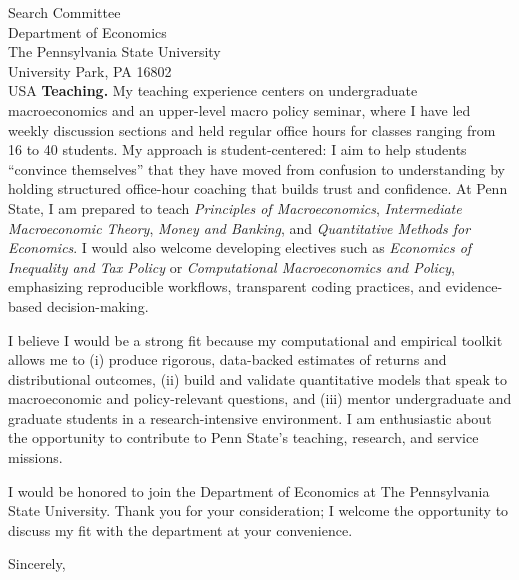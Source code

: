 \documentclass[11pt,letterpaper]{letter}
\begin{document}
\begin{letter}{Search Committee \\
Department of Economics \\
The Pennsylvania State University \\
University Park, PA 16802 \\ USA}
\textbf{Teaching.} My teaching experience centers on undergraduate macroeconomics and an upper-level macro policy seminar, where I have led weekly discussion sections and held regular office hours for classes ranging from 16 to 40 students. My approach is student-centered: I aim to help students “convince themselves” that they have moved from confusion to understanding by holding structured office-hour coaching that builds trust and confidence. At Penn State, I am prepared to teach \textit{Principles of Macroeconomics}, \textit{Intermediate Macroeconomic Theory}, \textit{Money and Banking}, and \textit{Quantitative Methods for Economics}. I would also welcome developing electives such as \textit{Economics of Inequality and Tax Policy} or \textit{Computational Macroeconomics and Policy}, emphasizing reproducible workflows, transparent coding practices, and evidence-based decision-making.

I believe I would be a strong fit because my computational and empirical toolkit allows me to (i) produce rigorous, data-backed estimates of returns and distributional outcomes, (ii) build and validate quantitative models that speak to macroeconomic and policy-relevant questions, and (iii) mentor undergraduate and graduate students in a research-intensive environment. I am enthusiastic about the opportunity to contribute to Penn State’s teaching, research, and service missions.

I would be honored to join the Department of Economics at The Pennsylvania State University. Thank you for your consideration; I welcome the opportunity to discuss my fit with the department at your convenience.

\closing{Sincerely,}

\end{letter}
\end{document}
